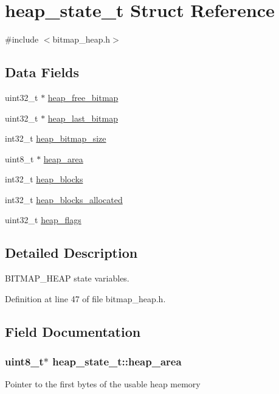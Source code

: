 \hypertarget{structheap__state__t}{\section{heap\-\_\-state\-\_\-t Struct Reference}
\label{structheap__state__t}
}


{\ttfamily \#include $<$bitmap\-\_\-heap.\-h$>$}

\subsection*{Data Fields}
\begin{DoxyCompactItemize}
\item 
uint32\-\_\-t $\ast$ \hyperlink{structheap__state__t_a1f6018b4dc58b24cb0f8454a6e60d922}{heap\-\_\-free\-\_\-bitmap}
\item 
uint32\-\_\-t $\ast$ \hyperlink{structheap__state__t_ad10537035000bee6924f49d8f2b5d82e}{heap\-\_\-last\-\_\-bitmap}
\item 
int32\-\_\-t \hyperlink{structheap__state__t_ae6493d6fa015bd8493807ea15e8216b8}{heap\-\_\-bitmap\-\_\-size}
\item 
uint8\-\_\-t $\ast$ \hyperlink{structheap__state__t_aeba083c473ad52fd9d2ded493180e1d8}{heap\-\_\-area}
\item 
int32\-\_\-t \hyperlink{structheap__state__t_acf4ba85bf16cafbfe88c68c723f24b65}{heap\-\_\-blocks}
\item 
int32\-\_\-t \hyperlink{structheap__state__t_a6dfcea700f36435885d5b717cf2b3307}{heap\-\_\-blocks\-\_\-allocated}
\item 
uint32\-\_\-t \hyperlink{structheap__state__t_a58279b65bfa3fbe383c73cbdd7527af0}{heap\-\_\-flags}
\end{DoxyCompactItemize}


\subsection{Detailed Description}
B\-I\-T\-M\-A\-P\-\_\-\-H\-E\-A\-P state variables. 

Definition at line 47 of file bitmap\-\_\-heap.\-h.



\subsection{Field Documentation}
\hypertarget{structheap__state__t_aeba083c473ad52fd9d2ded493180e1d8}{
\subsubsection[{heap\-\_\-area}]{\setlength{\rightskip}{0pt plus 5cm}uint8\-\_\-t$\ast$ heap\-\_\-state\-\_\-t\-::heap\-\_\-area}}\label{structheap__state__t_aeba083c473ad52fd9d2ded493180e1d8}
Pointer to the first bytes of the usable heap memory 

